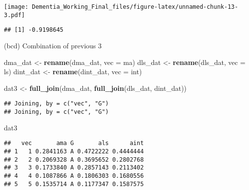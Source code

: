 \documentclass[]{article}
\newenvironment{Shaded}{\begin{snugshade}}{\end{snugshade}}
\newcommand{\DataTypeTok}[1]{\textcolor[rgb]{0.13,0.29,0.53}{#1}}
\newcommand{\KeywordTok}[1]{\textcolor[rgb]{0.13,0.29,0.53}{\textbf{#1}}}
\newcommand{\NormalTok}[1]{#1}
\newcommand{\OperatorTok}[1]{\textcolor[rgb]{0.81,0.36,0.00}{\textbf{#1}}}
\newcommand{\StringTok}[1]{\textcolor[rgb]{0.31,0.60,0.02}{#1}}
\begin{document}
\texttt{[image: Dementia\_Working\_Final\_files/figure-latex/unnamed-chunk-13-3.pdf]}

\begin{Shaded}
\end{Shaded}

\begin{verbatim}
## [1] -0.9198645
\end{verbatim}

(bcd) Combination of previous 3

\begin{Shaded}
\begin{Highlighting}[]
\NormalTok{dma_dat <-}\StringTok{ }\KeywordTok{rename}\NormalTok{(dma_dat, }\DataTypeTok{vec =}\NormalTok{ ma)}
\NormalTok{dls_dat <-}\StringTok{ }\KeywordTok{rename}\NormalTok{(dls_dat, }\DataTypeTok{vec =}\NormalTok{ ls)}
\NormalTok{dint_dat <-}\StringTok{ }\KeywordTok{rename}\NormalTok{(dint_dat, }\DataTypeTok{vec =}\NormalTok{ int)}

\NormalTok{dat3 <-}\StringTok{ }\KeywordTok{full_join}\NormalTok{(dma_dat, }\KeywordTok{full_join}\NormalTok{(dls_dat, dint_dat))}
\end{Highlighting}
\end{Shaded}

\begin{verbatim}
## Joining, by = c("vec", "G")
## Joining, by = c("vec", "G")
\end{verbatim}

\begin{Shaded}
\begin{Highlighting}[]
\NormalTok{dat3}
\end{Highlighting}
\end{Shaded}

\begin{verbatim}
##   vec       ama G       als      aint
## 1   1 0.2841163 A 0.4722222 0.4444444
## 2   2 0.2069328 A 0.3695652 0.2802768
## 3   3 0.1733840 A 0.2857143 0.2113402
## 4   4 0.1087866 A 0.1806303 0.1680556
## 5   5 0.1535714 A 0.1177347 0.1587575
\end{verbatim}
\end{document}
